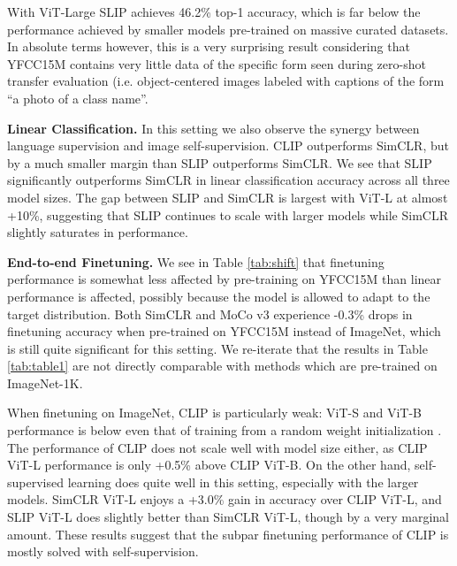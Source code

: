 \documentclass[10pt,twocolumn,letterpaper]{article}
\renewcommand{\paragraph}[1]{\vspace{1.25mm}\noindent\textbf{#1}}
\begin{document}
With ViT-Large SLIP achieves 46.2\% top-1 accuracy, which is far below the performance achieved by smaller models pre-trained on massive curated datasets.
In absolute terms however, this is a very surprising result considering that YFCC15M contains very little data of the specific form seen during zero-shot transfer evaluation (i.e. object-centered images labeled with captions of the form ``a photo of a {class name}''.

\paragraph{Linear Classification.}
\label{sec:linear}
In this setting we also observe the synergy between language supervision and image self-supervision.
CLIP outperforms SimCLR, but by a much smaller margin than SLIP outperforms SimCLR.
We see that SLIP significantly outperforms SimCLR in linear classification accuracy across all three model sizes.
The gap between SLIP and SimCLR is largest with ViT-L at almost +10\%, suggesting that SLIP continues to scale with larger models while SimCLR slightly saturates in performance.

\paragraph{End-to-end Finetuning.}
We see in Table \ref{tab:shift} that finetuning performance is somewhat less affected by pre-training on YFCC15M than linear performance is affected, possibly because the model is allowed to adapt to the target distribution.
Both SimCLR and MoCo v3 experience -0.3\% drops in finetuning accuracy when pre-trained on YFCC15M instead of ImageNet, which is still quite significant for this setting.
We re-iterate that the results in Table \ref{tab:table1} are not directly comparable with methods which are pre-trained on ImageNet-1K.

When finetuning on ImageNet, CLIP is particularly weak: ViT-S and ViT-B performance is below even that of training from a random weight initialization \cite{Touvron2021TrainingDI}.
The performance of CLIP does not scale well with model size either, as CLIP ViT-L performance is only +0.5\% above CLIP ViT-B.
On the other hand, self-supervised learning does quite well in this setting, especially with the larger models.
SimCLR ViT-L enjoys a +3.0\% gain in accuracy over CLIP ViT-L, and SLIP ViT-L does slightly better than SimCLR ViT-L, though by a very marginal amount.
These results suggest that the subpar finetuning performance of CLIP is mostly solved with self-supervision.
\end{document}
